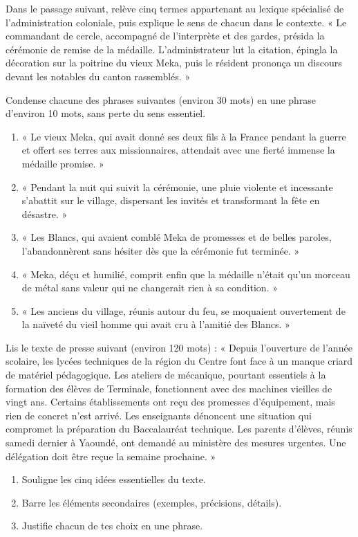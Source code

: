 \documentclass[11pt]{article}
\begin{document}
\begin{exercice}
Dans le passage suivant, relève cinq termes appartenant au lexique spécialisé de l'administration coloniale, puis explique le sens de chacun dans le contexte.
« Le commandant de cercle, accompagné de l'interprète et des gardes, présida la cérémonie de remise de la médaille. L'administrateur lut la citation, épingla la décoration sur la poitrine du vieux Meka, puis le résident prononça un discours devant les notables du canton rassemblés. »
\end{exercice}

\begin{exercice}
Condense chacune des phrases suivantes (environ 30 mots) en une phrase d'environ 10 mots, sans perte du sens essentiel.
\begin{enumerate}
\item « Le vieux Meka, qui avait donné ses deux fils à la France pendant la guerre et offert ses terres aux missionnaires, attendait avec une fierté immense la médaille promise. »
\item « Pendant la nuit qui suivit la cérémonie, une pluie violente et incessante s'abattit sur le village, dispersant les invités et transformant la fête en désastre. »
\item « Les Blancs, qui avaient comblé Meka de promesses et de belles paroles, l'abandonnèrent sans hésiter dès que la cérémonie fut terminée. »
\item « Meka, déçu et humilié, comprit enfin que la médaille n'était qu'un morceau de métal sans valeur qui ne changerait rien à sa condition. »
\item « Les anciens du village, réunis autour du feu, se moquaient ouvertement de la naïveté du vieil homme qui avait cru à l'amitié des Blancs. »
\end{enumerate}
\end{exercice}

\begin{exercice}
Lis le texte de presse suivant (environ 120 mots) : « Depuis l'ouverture de l'année scolaire, les lycées techniques de la région du Centre font face à un manque criard de matériel pédagogique. Les ateliers de mécanique, pourtant essentiels à la formation des élèves de Terminale, fonctionnent avec des machines vieilles de vingt ans. Certains établissements ont reçu des promesses d'équipement, mais rien de concret n'est arrivé. Les enseignants dénoncent une situation qui compromet la préparation du Baccalauréat technique. Les parents d'élèves, réunis samedi dernier à Yaoundé, ont demandé au ministère des mesures urgentes. Une délégation doit être reçue la semaine prochaine. »
\begin{enumerate}
\item Souligne les cinq idées essentielles du texte.
\item Barre les éléments secondaires (exemples, précisions, détails).
\item Justifie chacun de tes choix en une phrase.
\end{enumerate}
\end{exercice}
\end{document}
